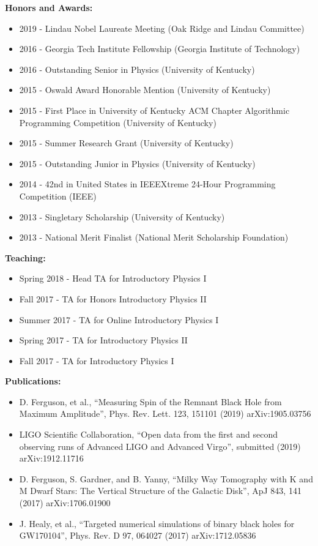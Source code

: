 \documentclass[11pt]{article}
\begin{document}
\begin{flushleft}
  \textbf{Honors and Awards:}
  \begin{itemize}
  \item 2019 - Lindau Nobel Laureate Meeting (Oak Ridge and Lindau Committee)
  \item 2016 - Georgia Tech Institute Fellowship (Georgia Institute of Technology)
  \item 2016 - Outstanding Senior in Physics (University of Kentucky)
  \item 2015 - Oswald Award Honorable Mention (University of Kentucky)
  \item 2015 - First Place in University of Kentucky ACM Chapter Algorithmic Programming Competition (University of Kentucky)
  \item 2015 - Summer Research Grant (University of Kentucky)
  \item 2015 - Outstanding Junior in Physics (University of Kentucky)
  \item 2014 - 42nd in United States in IEEEXtreme 24-Hour Programming Competition (IEEE)
  \item 2013 - Singletary Scholarship (University of Kentucky)
  \item 2013 - National Merit Finalist (National Merit Scholarship Foundation)
  \end{itemize}
  
  \textbf{Teaching:}
  \begin{itemize}
  \item Spring 2018 - Head TA for Introductory Physics I
  \item Fall 2017 - TA for Honors Introductory Physics II
  \item Summer 2017 - TA for Online Introductory Physics I
  \item Spring 2017 - TA for Introductory Physics II
  \item Fall 2017 - TA for Introductory Physics I
  \end{itemize}

  \textbf{Publications:}
  \begin{itemize}
  \item D. Ferguson, et al., ``Measuring Spin of the Remnant Black Hole from Maximum Amplitude'', Phys. Rev. Lett. 123, 151101 (2019) arXiv:1905.03756
  \item LIGO Scientific Collaboration, ``Open data from the first and second observing runs of Advanced LIGO and Advanced Virgo'', submitted (2019) arXiv:1912.11716
  \item D. Ferguson, S. Gardner, and B. Yanny, ``Milky Way Tomography with K and M Dwarf Stars: The Vertical Structure of the Galactic Disk'', ApJ 843, 141 (2017) arXiv:1706.01900
    \item J. Healy, et al., ``Targeted numerical simulations of binary black holes for GW170104'', Phys. Rev. D 97, 064027 (2017) arXiv:1712.05836
  \end{itemize}


\end{flushleft}
\end{document}
